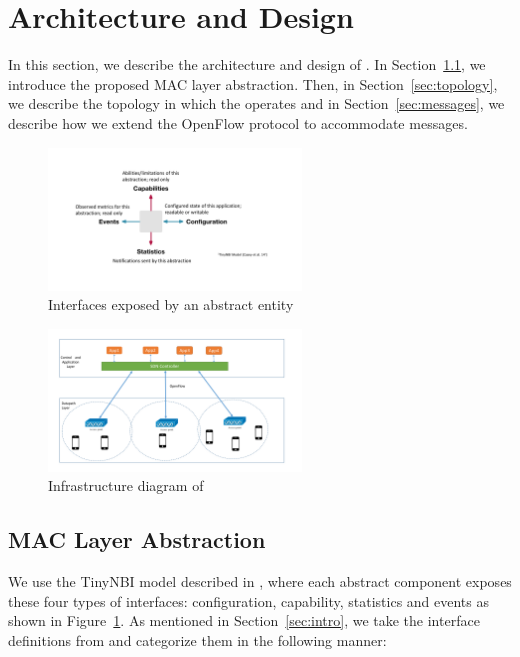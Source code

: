 \section{\crossflow Architecture and Design}
\label{sec:architecture}

In this section, we describe the architecture and design of \pmac. In Section~\ref{sec:mac}, we introduce the proposed MAC layer abstraction. Then, in Section~\ref{sec:topology}, we describe the topology in which the \pmac operates and in Section~\ref{sec:messages}, we describe how we extend the OpenFlow protocol to accommodate \pmac messages.


\begin{figure}[t]
  \centering
  \includegraphics[width=0.6\textwidth]{figures/abstract.pdf}
  \caption{Interfaces exposed by an abstract entity}
  \label{fig:abstract}
\end{figure}

\begin{figure}[t]
  \centering
  \includegraphics[width=0.6\textwidth]{figures/infrastructure.pdf}
  \caption{Infrastructure diagram of \pmac}
  \label{fig:infrastructure}
\end{figure}

\subsection{MAC Layer Abstraction}
\label{sec:mac}
We use the TinyNBI model described in \cite{Casey:14}, where each abstract component exposes these four types of interfaces: configuration, capability, statistics and events as shown in Figure~\ref{fig:abstract}. As mentioned in Section~\ref{sec:intro}, we take the interface definitions from \cite{macproc} and categorize them in the following manner:

